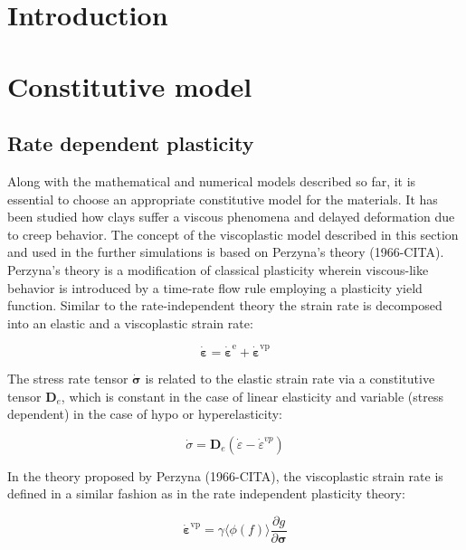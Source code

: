 \documentclass[applsci,journal,article,submit,moreauthors,pdftex]{Definitions/mdpi}
\begin{document}
\section{Introduction}


 
\section{Constitutive model}


\subsection{Rate dependent plasticity}
Along with the mathematical and numerical models described so far, it is essential to choose an appropriate constitutive model for the materials. It has been studied how clays suffer a viscous phenomena and delayed deformation due to creep behavior.
The concept of the viscoplastic model described in this section and used in the further simulations is based on Perzyna’s theory (1966-CITA). Perzyna’s theory is a modification of classical plasticity wherein viscous-like behavior is introduced by a time-rate flow rule employing a plasticity yield function. Similar to the rate-independent theory the strain rate is decomposed into an elastic and a viscoplastic strain rate:

\begin{equation}
\dot{\boldsymbol{\varepsilon}}=\dot{\boldsymbol{\varepsilon}}^{\mathrm{e}}+\dot{\boldsymbol{\varepsilon}}^{\mathrm{vp}}
\end{equation}

The stress rate tensor $\boldsymbol{\dot{\sigma}}$ is related to the elastic strain rate via a constitutive tensor $\boldsymbol{D}_{e}$, which is constant in the case of linear elasticity and variable (stress dependent) in the case of hypo or hyperelasticity:

\begin{equation}
\dot{\sigma}=\mathbf{D}_{e}\left(\dot{\varepsilon}-\dot{\varepsilon}^{v p}\right)
\end{equation}

In the theory proposed by Perzyna (1966-CITA), the viscoplastic strain rate is defined in a similar fashion as in the rate independent plasticity theory:

\begin{equation}
\dot{\boldsymbol{\varepsilon}}^{\mathrm{vp}}=\gamma\langle\phi(f)\rangle \frac{\partial g}{\partial \boldsymbol{\sigma}}
\end{equation}
\end{document}
